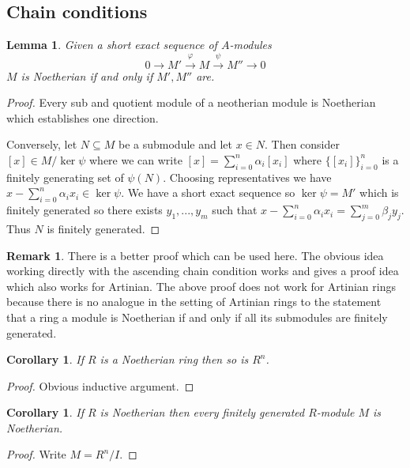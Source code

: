 \documentclass[12pt]{article}
\theoremstyle{plain}
\newtheorem{lemma}[thm]{Lemma}
\newtheorem{cor}[thm]{Corollary}
\theoremstyle{definition}
\newtheorem{remark}[thm]{Remark}
\newcommand{\lto}{\longrightarrow}
\begin{document}
\subsection{Chain conditions}
\begin{lemma}
\label{lem:neotherian_ses} Given a short exact sequence of $A$-modules
\[0 \lto M' \stackrel{\varphi}{\lto} M \stackrel{\psi}{\lto} M'' \lto 0\]
$M$ is Noetherian if and only if $M',M''$ are.
\end{lemma}
\begin{proof}
Every sub and quotient module of a neotherian module is Noetherian which establishes one direction.

Conversely, let $N \subseteq M$ be a submodule and let $x \in N$. Then consider $[x] \in M/\ker \psi$ where we can write $[x] = \sum_{i = 0}^n \alpha_i [x_i]$ where $\lbrace [x_i]\rbrace_{i = 0}^n$ is a finitely generating set of $\psi(N)$. Choosing representatives we have $x - \sum_{i = 0}^n\alpha_i x_i \in \ker \psi$. We have a short exact sequence so $\ker \psi = M'$ which is finitely generated so there exists $y_1,...,y_m$ such that $x - \sum_{i = 0}^n \alpha_i x_i = \sum_{j = 0}^m\beta_j y_j$. Thus $N$ is finitely generated.
\end{proof}
\begin{remark}
There is a better proof which can be used here. The obvious idea working directly with the ascending chain condition works and gives a proof idea which also works for Artinian. The above proof does not work for Artinian rings because there is no analogue in the setting of Artinian rings to the statement that a ring a module is Noetherian if and only if all its submodules are finitely generated.
\end{remark}
\begin{cor}
If $R$ is a Noetherian ring then so is $R^n$.
\end{cor}
\begin{proof}
Obvious inductive argument.
\end{proof}
\begin{cor}
If $R$ is Noetherian then every finitely generated $R$-module $M$ is Noetherian.
\end{cor}
\begin{proof}
Write $M = R^n/I$.
\end{proof}
\end{document}
